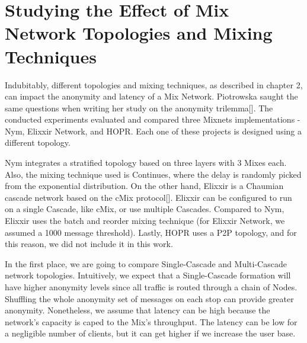 \documentclass[logo,msc,cyber]{infthesis}   %
\begin{document}
\section{Studying the Effect of Mix Network Topologies and Mixing Techniques}

Indubitably, different topologies and mixing techniques, as described in chapter 2,
can impact the anonymity and latency of a Mix Network. Piotrowska saught the
same questions when writing her study on the anonymity trilemma[]. The conducted
experiments evaluated and compared three Mixnets implementations - Nym, Elixxir
Network, and HOPR. Each one of these projects is designed using a different
topology. 

Nym integrates a stratified topology based on three layers with 3 Mixes each.
Also, the mixing technique used is Continues, where the delay is randomly
picked from the exponential distribution. On the other hand, Elixxir is a
Chaumian cascade network based on the cMix protocol[]. Elixxir can be configured
to run on a single Cascade, like cMix, or use multiple Cascades. Compared to
Nym, Elixxir uses the batch and reorder mixing technique (for Elixxir Network,
we assumed a 1000 message threshold). Lastly, HOPR uses a P2P topology, and for
this reason, we did not include it in this work.


In the first place, we are going to compare Single-Cascade and Multi-Cascade
network topologies. Intuitively, we expect that a Single-Cascade formation will
have higher anonymity levels since all traffic is routed through a chain of
Nodes. Shuffling the whole anonymity set of messages on each stop can provide
greater anonymity. Nonetheless, we assume that latency can be high because the
network's capacity is caped to the Mix's throughput. The latency can be low for
a negligible number of clients, but it can get higher if we increase the user
base.
\end{document}
